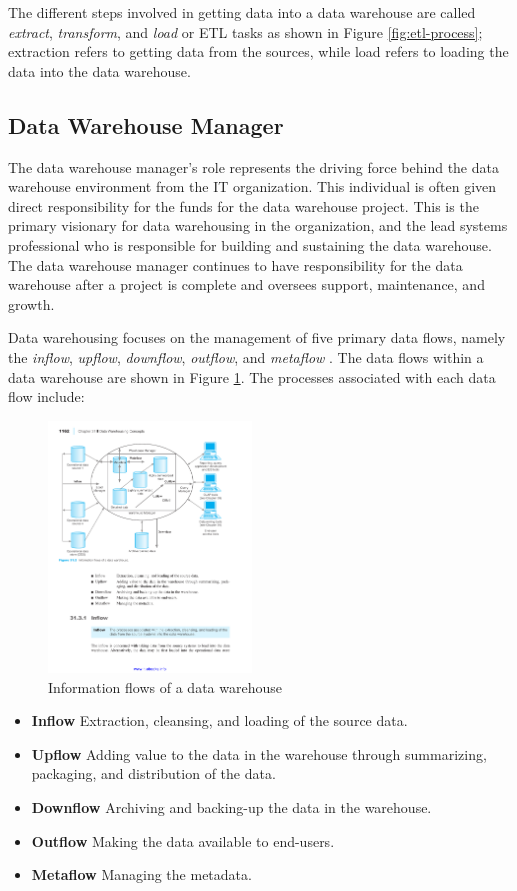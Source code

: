 \documentclass{vldb}
\newcommand{\bi}{\begin{itemize}}
\newcommand{\ei}{\end{itemize}}
\newcommand{\ii}{\item}
\begin{document}
The different steps involved in getting data into a data warehouse are called
\textit{extract}, \textit{transform}, and \textit{load} or ETL tasks as shown in Figure \ref{fig:etl-process}; extraction refers to getting data from
the sources, while load refers to loading the data into the data warehouse.

\subsection{Data Warehouse Manager}
The data warehouse manager’s role represents the driving force behind the data warehouse environment from the IT organization. This individual is often given direct responsibility for the funds for the data warehouse project. This is the primary visionary for data warehousing in the organization, and the lead systems professional who is responsible for building and sustaining the data warehouse. The data warehouse manager continues to have responsibility for the data warehouse after a project is complete and oversees support, maintenance, and growth.

Data warehousing focuses on the management of five primary data flows, namely the \textit{inflow}, \textit{upflow}, \textit{downflow}, \textit{outflow}, and \textit{metaflow}  \cite{Thomas:DW}. The data flows within a data warehouse are shown in Figure \ref{fig:dwflow}. The processes associated with each data flow include:

\begin{figure}[htb]
\centering
\includegraphics[width=0.48\textwidth]{dwflow}
\caption{Information flows of a data warehouse}
\label{fig:dwflow}
\end{figure}

\bi
\ii \textbf{Inflow} Extraction, cleansing, and loading of the source data.
\ii \textbf{Upflow} Adding value to the data in the warehouse through summarizing, packaging,  and distribution of the data.
\ii \textbf{Downflow} Archiving and backing-up the data in the warehouse.
\ii \textbf{Outflow} Making the data available to end-users.
\ii \textbf{Metaflow} Managing the metadata.
\ei
\end{document}
